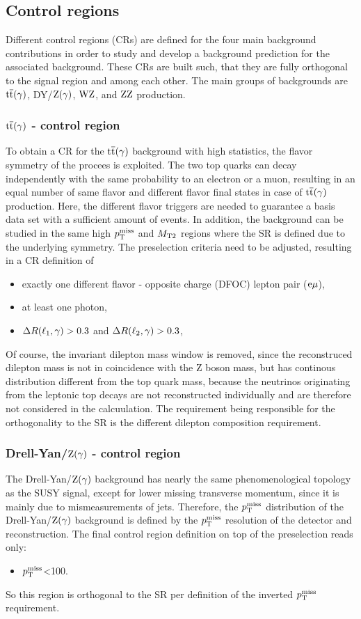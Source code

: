 \subsection{Control regions}\label{sec:CR}
Different control regions (CRs) are defined for the four main background contributions in order to study and develop a background prediction for the associated background. These CRs are built such, that they are fully orthogonal to the signal region and among each other. The main groups of backgrounds are ${\mathrm{t}\overline{\mathrm{t}}}(\gamma)$, DY/$\mathrm{Z}(\gamma)$, $\mathrm{W}\mathrm{Z}$, and $\mathrm{Z}\mathrm{Z}$ production.

\subsubsection*{${\mathrm{t}\overline{\mathrm{t}}}(\gamma)$ - control region}
To obtain a CR for the ${\mathrm{t}\overline{\mathrm{t}}}(\gamma)$ background with high statistics, the flavor symmetry of the procees is exploited. The two top quarks can decay independently with the same probability to an electron or a muon, resulting in an equal number of same flavor and different flavor final states in case of ${\mathrm{t}\overline{\mathrm{t}}}(\gamma)$ production. Here, the different flavor triggers are needed to guarantee a basis data set with a sufficient amount of events. In addition, the background can be studied in the same high $p_{\mathrm{T}}^\text{miss}$ and $M_{\mathrm{T2}}$ regions where the SR is defined due to the underlying symmetry. The preselection criteria need to be adjusted, resulting in a CR definition of
\begin{itemize}
 \item exactly one different flavor - opposite charge (DFOC) lepton pair ($\mathrm{e}{\mu}$),
 \item at least one photon,
 \item $\Delta R(\ell_1,\gamma)>0.3$ and $\Delta R(\ell_2,\gamma)>0.3$,
\end{itemize}
Of course, the invariant dilepton mass window is removed, since the reconstruced dilepton mass is not in coincidence with the Z boson mass, but has continous distribution different from the top quark mass, because the neutrinos originating from the leptonic top decays are not reconstructed individually and are therefore not considered in the calcuulation. The requirement being responsible for the orthogonality to the SR is the different dilepton composition requirement.
\subsubsection*{Drell-Yan/$\mathrm{Z}(\gamma)$ - control region}
The Drell-Yan/$\mathrm{Z}(\gamma)$ background has nearly the same phenomenological topology as the SUSY signal, except for lower missing transverse momentum, since it is mainly due to mismeasurements of jets. Therefore, the $p_{\mathrm{T}}^\text{miss}$ distribution of the Drell-Yan/$\mathrm{Z}(\gamma)$ background is defined by the $p_{\mathrm{T}}^\text{miss}$ resolution of the detector and reconstruction. The final control region definition on top of the preselection reads only:
\begin{itemize}
 \item $p_{\mathrm{T}}^\text{miss}$<100\GeV.
\end{itemize}
So this region is orthogonal to the SR per definition of the inverted $p_{\mathrm{T}}^\text{miss}$ requirement.
